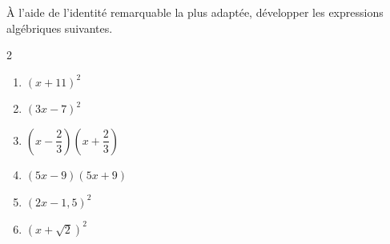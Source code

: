 \begin{exo}
	À l'aide de l'identité remarquable la plus adaptée, développer les expressions algébriques suivantes.
	\vspace*{-2mm}
	\begin{multicols}{2}
		\begin{enumerate}[label=\alph*)]
			\item $(x + 11)^2$
			\item $(3x - 7)^2$
			\item $\left( x - \dfrac{2}{3} \right)\left( x + \dfrac{2}{3} \right)$
			\item $(5x - 9)(5x + 9)$
			\item $(2x - 1,5)^2$
			\item $(x + \sqrt{2})^2$
		\end{enumerate}
	\end{multicols}
\end{exo}
